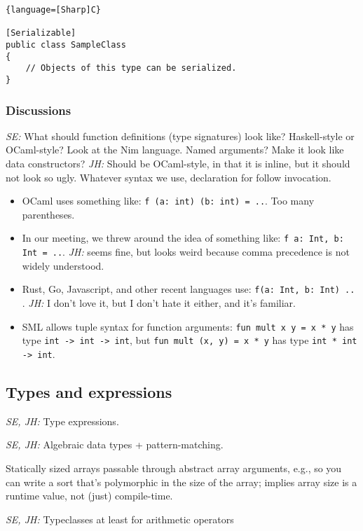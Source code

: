 \documentclass{article}
\begin{document}
\begin{lstlisting}{language=[Sharp]C}
  
[Serializable]
public class SampleClass
{
    // Objects of this type can be serialized.
} 
\end{lstlisting}

\subsubsection{Discussions}

\textit{SE:} What should function definitions (type signatures) look like?
Haskell-style or OCaml-style?  Look at the Nim language.  Named arguments?  Make
it look like data constructors?
\textit{JH:} Should be OCaml-style, in that it is inline, but it should not look
so ugly. Whatever syntax we use, declaration for follow invocation.

\begin{itemize}
  \item OCaml uses something like: \verb|f (a: int) (b: int) = ..|. Too many
    parentheses.
  \item In our meeting, we threw around the idea of something like:
    \verb|f a: Int, b: Int = ..|. \textit{JH:} seems fine, but looks weird because comma
    precedence is not widely understood.
  \item Rust, Go, Javascript, and other recent languages use: \verb|f(a: Int, b: Int) .. |.
    \textit{JH:} I don't love it, but I don't hate it either, and it's familiar.

  \item SML allows tuple syntax for function arguments:
    \verb|fun mult x y = x * y| has type
    \verb|int -> int -> int|,
    but \verb|fun mult (x, y) = x * y| has type
    \verb|int * int -> int|.
\end{itemize}

\subsection{Types and expressions}

\textit{SE, JH:} Type expressions.

\textit{SE, JH:} Algebraic data types + pattern-matching.

Statically sized arrays passable through abstract array arguments, e.g., so you
can write a sort that's polymorphic in the size of the array; implies array size
is a runtime value, not (just) compile-time.

\textit{SE, JH:} Typeclasses at least for arithmetic operators
\end{document}

